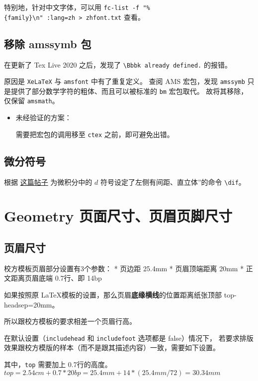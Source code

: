 \documentclass[../Main/thesis.tex]{subfiles}
\begin{document}
特别地，针对中文字体，可以用
\texttt{fc-list\ -f\ "\%\{family\}\textbackslash{}n"\ :lang=zh\ \textgreater{}\ zhfont.txt}
查看。

\subsection{移除 amssymb 包}

在更新了 Tex Live 2020 之后，发现了
\texttt{\textbackslash Bbbk already\ defined.}
的报错。

原因是 \texttt{XeLaTeX} 与 \texttt{amsfont} 中有了重复定义。 查阅 AMS
宏包，发现 \texttt{amssymb}
只是提供了部分数学字符的粗体、而且可以被标准的 \texttt{bm} 宏包取代。
故将其移除，仅保留 \texttt{amsmath}。

\begin{itemize}
\item
  未经验证的方案：

  需要把宏包的调用移至 \texttt{ctex} 之前，即可避免出错。
\end{itemize}

\subsection{微分符号}

根据
\href{https://liam.page/2017/05/01/the-correct-way-to-use-differential-operator/}{这篇帖子}
为微积分中的 \(d\) 符号设定了左侧有间距、直立体''的命令
\texttt{\textbackslash{}dif}。

\section{Geometry
页面尺寸、页眉页脚尺寸}

\subsection{页眉尺寸}

校方模板页眉部分设置有3个参数： * 页边距 25.4mm * 页眉顶端距离 20mm *
正文距离页眉底端 0.7行、即 14bp

如果按照原 \LaTeX 模板的设置，那么页眉\textbf{底缘横线}的位置距离纸张顶部
top-headsep=20mm。


所以跟校方模板的要求相差一个页眉行高。

在默认设置（\texttt{includehead} 和 \texttt{includefoot} 选项都是
false）情况下，
若要求排版效果跟校方模版的样本（而不是跟其描述内容）一致，需要如下设置。


其中，\texttt{top} 需要加上 0.7行的高度。
\(top = 2.54cm + 0.7*20bp = 25.4mm + 14*(25.4mm/72) = 30.34mm\)
\end{document}
